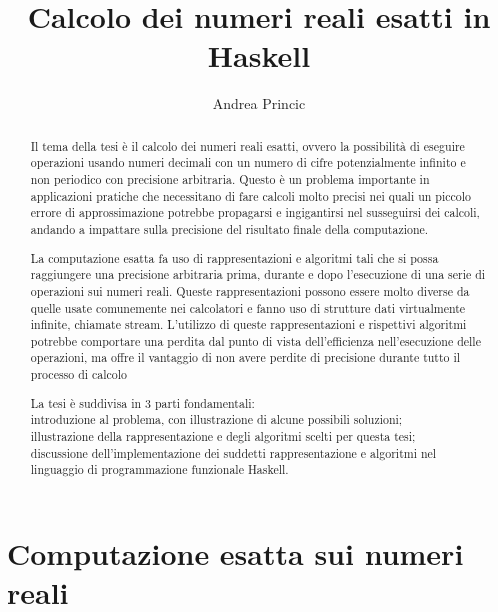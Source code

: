 \documentclass[Lau]{sapthesis}
\title{Calcolo dei numeri reali esatti in Haskell}
\author{Andrea Princic}
\begin{document}
\frontmatter
\maketitle



\begin{abstract}
Il tema della tesi è il calcolo dei numeri reali esatti, ovvero la possibilità 
di eseguire operazioni usando numeri decimali con un numero di cifre 
potenzialmente infinito e non periodico con precisione arbitraria. Questo è un 
problema importante in applicazioni pratiche che necessitano di fare calcoli 
molto precisi nei quali un piccolo errore di approssimazione potrebbe propagarsi 
e ingigantirsi nel susseguirsi dei calcoli, andando a impattare sulla precisione 
del risultato finale della computazione.

\medskip

La computazione esatta fa uso di rappresentazioni e algoritmi tali che si possa 
raggiungere una precisione arbitraria prima, durante e dopo l'esecuzione di una 
serie di operazioni sui numeri reali. Queste rappresentazioni possono essere 
molto diverse da quelle usate comunemente nei calcolatori e fanno uso di 
strutture dati virtualmente infinite, chiamate stream. L'utilizzo di queste 
rappresentazioni e rispettivi algoritmi potrebbe comportare una perdita dal 
punto di vista dell'efficienza nell'esecuzione delle operazioni, ma offre il 
vantaggio di non avere perdite di precisione durante tutto il processo di 
calcolo

\medskip

La tesi è suddivisa in 3 parti fondamentali:\\
introduzione al problema, con illustrazione di alcune possibili soluzioni;\\
illustrazione della rappresentazione e degli algoritmi scelti per questa tesi;\\
discussione dell'implementazione dei suddetti rappresentazione e algoritmi nel 
linguaggio di programmazione funzionale Haskell.
\end{abstract}



\tableofcontents



\mainmatter



\chapter{Computazione esatta sui numeri reali}
\end{document}
